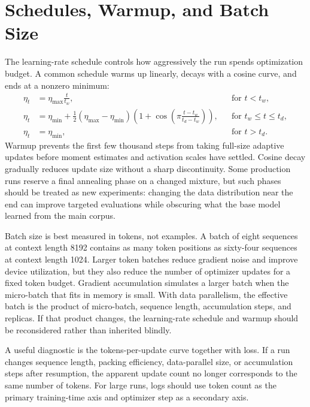 \section{Schedules, Warmup, and Batch Size}
\label{sec:schedules-warmup-batch}

The learning-rate schedule controls how aggressively the run spends optimization budget. A common schedule warms up linearly, decays with a cosine curve, and ends at a nonzero minimum:
\begin{equation}
\begin{aligned}
\eta_t &= \eta_{\max}\frac{t}{t_w}, && \text{for } t < t_w,\\
\eta_t &= \eta_{\min} + \frac{1}{2}(\eta_{\max}-\eta_{\min})
  (1+\cos(\pi \frac{t-t_w}{t_d-t_w})),
  && \text{for } t_w \le t \le t_d,\\
\eta_t &= \eta_{\min}, && \text{for } t > t_d.
\end{aligned}
\end{equation}
Warmup prevents the first few thousand steps from taking full-size adaptive updates before moment estimates and activation scales have settled. Cosine decay gradually reduces update size without a sharp discontinuity. Some production runs reserve a final annealing phase on a changed mixture, but such phases should be treated as new experiments: changing the data distribution near the end can improve targeted evaluations while obscuring what the base model learned from the main corpus.

Batch size is best measured in tokens, not examples. A batch of eight sequences at context length 8192 contains as many token positions as sixty-four sequences at context length 1024. Larger token batches reduce gradient noise and improve device utilization, but they also reduce the number of optimizer updates for a fixed token budget. Gradient accumulation simulates a larger batch when the micro-batch that fits in memory is small. With data parallelism, the effective batch is the product of micro-batch, sequence length, accumulation steps, and replicas. If that product changes, the learning-rate schedule and warmup should be reconsidered rather than inherited blindly.

A useful diagnostic is the tokens-per-update curve together with loss. If a run changes sequence length, packing efficiency, data-parallel size, or accumulation steps after resumption, the apparent update count no longer corresponds to the same number of tokens. For large runs, logs should use token count as the primary training-time axis and optimizer step as a secondary axis.

